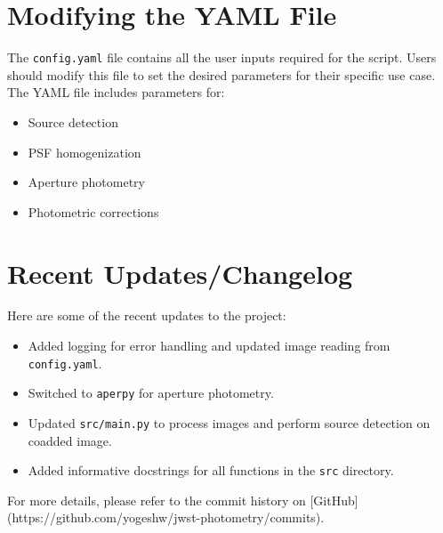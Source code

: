 \documentclass{article}
\begin{document}
\section{Modifying the YAML File}
The \texttt{config.yaml} file contains all the user inputs required for the script. Users should modify this file to set the desired parameters for their specific use case. The YAML file includes parameters for:
\begin{itemize}
    \item Source detection
    \item PSF homogenization
    \item Aperture photometry
    \item Photometric corrections
\end{itemize}

\section{Recent Updates/Changelog}
Here are some of the recent updates to the project:
\begin{itemize}
    \item Added logging for error handling and updated image reading from \texttt{config.yaml}.
    \item Switched to \texttt{aperpy} for aperture photometry.
    \item Updated \texttt{src/main.py} to process images and perform source detection on coadded image.
    \item Added informative docstrings for all functions in the \texttt{src} directory.
\end{itemize}
For more details, please refer to the commit history on [GitHub](https://github.com/yogeshw/jwst-photometry/commits).
\end{document}
